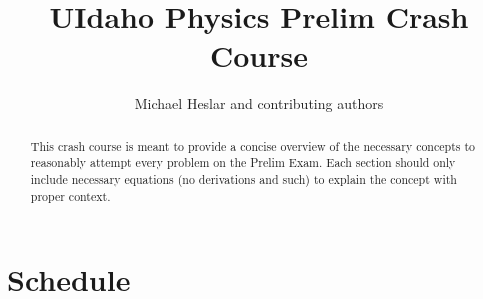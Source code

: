 \documentclass[]{article}
\title{UIdaho Physics Prelim Crash Course}
\author{Michael Heslar and contributing authors}
\date{}
\begin{document}
\maketitle

\begin{abstract}
This crash course is meant to provide a concise overview of the necessary concepts to reasonably attempt every problem on the Prelim Exam. Each section should only include necessary equations (no derivations and such) to explain the concept with proper context. 
\end{abstract}

\tableofcontents
\pagebreak
\section{Schedule}
\end{document}
